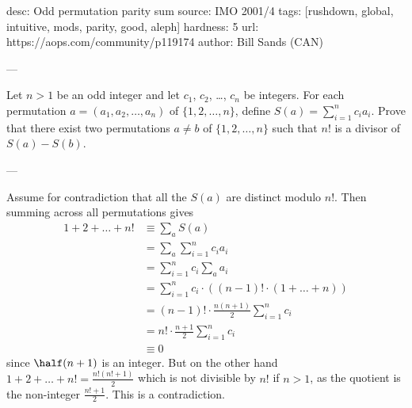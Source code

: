 desc:  Odd permutation parity sum
source: IMO 2001/4
tags:  [rushdown, global, intuitive, mods, parity, good, aleph]
hardness: 5
url: https://aops.com/community/p119174
author: Bill Sands (CAN)

---

Let $n > 1$ be an odd integer and let $c_1$, $c_2$, \dots, $c_n$ be integers.
For each permutation $a = (a_1, a_2, \dots, a_n)$
of $\{1,2,\dots,n\}$, define $S(a) = \sum_{i=1}^n c_i a_i$.
Prove that there exist two permutations $a \neq b$
of $\{1,2,\dots,n\}$ such that $n!$ is a divisor of $S(a)-S(b)$.

---

Assume for contradiction that all the $S(a)$ are distinct modulo $n!$.
Then summing across all permutations gives
\begin{align*}
  1 + 2 + \dots + n!
  &\equiv \sum_a S(a) \\
  &= \sum_a \sum_{i=1}^n c_i a_i \\
  &= \sum_{i=1}^n c_i \sum_a a_i \\
  &= \sum_{i=1}^n c_i \cdot \left( (n-1)! \cdot (1+\dots+n) \right) \\
  &= (n-1)! \cdot \frac{n(n+1)}{2} \sum_{i=1}^n c_i \\
  &= n! \cdot \frac{n+1}{2} \sum_{i=1}^n c_i \\
  &\equiv 0
\end{align*}
since $\half(n+1)$ is an integer.
But on the other hand
$1 + 2 + \dots + n! = \frac{n!(n!+1)}{2}$
which is not divisible by $n!$ if $n > 1$,
as the quotient is the non-integer $\frac{n!+1}{2}$.
This is a contradiction.
